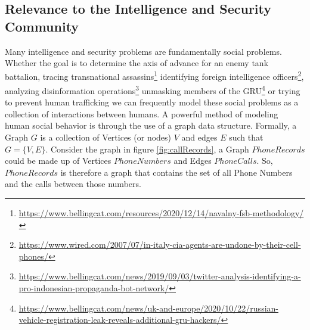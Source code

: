 \documentclass[letterpaper, 10pt]{article}
\begin{document}
\begin{multicols}{2}
        \subsection{Relevance to the Intelligence and Security Community} \label{section:relevance}
        
        \par{Many intelligence and security problems are fundamentally social problems. 
        Whether the goal is to determine the axis of advance for an enemy tank battalion, tracing transnational assassins\footnote{\href{https://www.bellingcat.com/resources/2020/12/14/navalny-fsb-methodology/}{https://www.bellingcat.com/resources/2020/12/14/navalny-fsb-methodology/}} identifying foreign intelligence officers\footnote{\href{https://www.wired.com/2007/07/in-italy-cia-agents-are-undone-by-their-cell-phones/}{https://www.wired.com/2007/07/in-italy-cia-agents-are-undone-by-their-cell-phones/}}, analyzing disinformation operations\footnote{\href{https://www.bellingcat.com/news/2019/09/03/twitter-analysis-identifying-a-pro-indonesian-propaganda-bot-network/}{https://www.bellingcat.com/news/2019/09/03/twitter-analysis-identifying-a-pro-indonesian-propaganda-bot-network/}} unmasking members of the GRU\footnote{\href{https://www.bellingcat.com/news/uk-and-europe/2020/10/22/russian-vehicle-registration-leak-reveals-additional-gru-hackers/}{https://www.bellingcat.com/news/uk-and-europe/2020/10/22/russian-vehicle-registration-leak-reveals-additional-gru-hackers/}} or trying to prevent human trafficking \cite{Szekely2015} we can frequently model these social problems as a collection of interactions between humans. 
        A powerful method of modeling human social behavior is through the use of a graph data structure.
        Formally, a Graph $G$ is a collection of Vertices (or nodes) $V$ and edges $E$ such that $G=\{V,E\}$.
        Consider the graph in figure \ref{fig:callRecords}, a Graph $PhoneRecords$ could be made up of Vertices $PhoneNumbers$ and Edges $PhoneCalls$.
        So, $PhoneRecords$ is therefore a graph that contains the set of all Phone Numbers and the calls between those numbers.}


\end{multicols}
\end{document}
